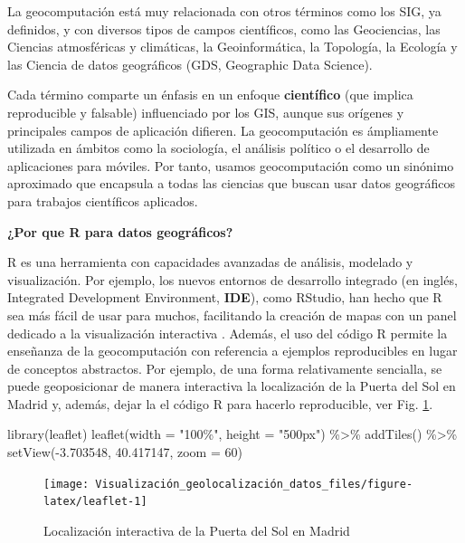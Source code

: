 \documentclass[
]{report}
\newenvironment{Shaded}{\begin{snugshade}}{\end{snugshade}}
\newcommand{\AttributeTok}[1]{\textcolor[rgb]{0.77,0.63,0.00}{#1}}
\newcommand{\DecValTok}[1]{\textcolor[rgb]{0.00,0.00,0.81}{#1}}
\newcommand{\FloatTok}[1]{\textcolor[rgb]{0.00,0.00,0.81}{#1}}
\newcommand{\FunctionTok}[1]{\textcolor[rgb]{0.00,0.00,0.00}{#1}}
\newcommand{\NormalTok}[1]{#1}
\newcommand{\SpecialCharTok}[1]{\textcolor[rgb]{0.00,0.00,0.00}{#1}}
\newcommand{\StringTok}[1]{\textcolor[rgb]{0.31,0.60,0.02}{#1}}
\theoremstyle{definition}
\theoremstyle{definition}
\theoremstyle{definition}
\theoremstyle{definition}
\theoremstyle{remark}
\begin{document}
La geocomputación está muy relacionada con otros términos como los SIG, ya
definidos, y con diversos tipos de campos científicos, como las Geociencias, las
Ciencias atmosféricas y climáticas, la Geoinformática, la Topología, la Ecología
y las Ciencia de datos geográficos (GDS, Geographic Data Science).

Cada término comparte un énfasis en un enfoque \textbf{científico} (que implica
reproducible y falsable) influenciado por los GIS, aunque sus orígenes y
principales campos de aplicación difieren. La geocomputación es ámpliamente
utilizada en ámbitos como la sociología, el análisis político o el desarrollo de
aplicaciones para móviles. Por tanto, usamos geocomputación como un sinónimo
aproximado que encapsula a todas las ciencias que buscan usar datos geográficos
para trabajos científicos aplicados.

\textbf{¿Por que R para datos geográficos?}

R es una herramienta con capacidades avanzadas de análisis, modelado y
visualización. Por ejemplo, los nuevos entornos de desarrollo integrado (en
inglés, Integrated Development Environment, \textbf{IDE}), como RStudio, han hecho
que R sea más fácil de usar para muchos, facilitando la creación de mapas con un
panel dedicado a la visualización interactiva \citep{Lovelance_et_al_2019}. Además,
el uso del código R permite la enseñanza de la geocomputación con referencia a
ejemplos reproducibles en lugar de conceptos abstractos. Por ejemplo, de una
forma relativamente sencialla, se puede geoposicionar de manera interactiva la
localización de la Puerta del Sol en Madrid y, además, dejar la el código R para
hacerlo reproducible, ver Fig. \ref{fig:leaflet}.

\begin{Shaded}
\begin{Highlighting}[]
\FunctionTok{library}\NormalTok{(leaflet)}
\FunctionTok{leaflet}\NormalTok{(}\AttributeTok{width =} \StringTok{"100\%"}\NormalTok{, }\AttributeTok{height =} \StringTok{"500px"}\NormalTok{) }\SpecialCharTok{\%\textgreater{}\%}
  \FunctionTok{addTiles}\NormalTok{() }\SpecialCharTok{\%\textgreater{}\%}
  \FunctionTok{setView}\NormalTok{(}\SpecialCharTok{{-}}\FloatTok{3.703548}\NormalTok{, }\FloatTok{40.417147}\NormalTok{, }\AttributeTok{zoom =} \DecValTok{60}\NormalTok{)}
\end{Highlighting}
\end{Shaded}

\begin{figure}

{\centering \texttt{[image: Visualización\_geolocalización\_datos\_files/figure-latex/leaflet-1]} 

}

\caption{Localización interactiva de la Puerta del Sol en Madrid}\label{fig:leaflet}
\end{figure}
\end{document}
